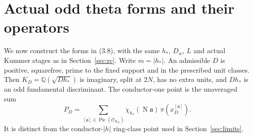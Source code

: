 \documentclass[11pt]{article}
\theoremstyle{definition}
\theoremstyle{remark}
\newcommand{\Q}{\mathbb Q}
\newcommand{\Norm}{\operatorname{N}}
\begin{document}


\section{Actual odd theta forms and their operators}\label{app:odd-source}
We now construct the forms in (3.8), with the same $h_*$, $D_w$, $L$
and actual Kummer stages as in Section~\ref{sec:rc}.
Write $m=|h_*|$. An admissible $D$ is positive, squarefree, prime to
the fixed support and in the prescribed unit classes. Then
$K_D=\Q(\sqrt{Dh_*})$ is imaginary, split at $2N$, has no extra
units, and $Dh_*$ is an odd fundamental discriminant.
The conductor-one point is the unaveraged sum
\[
 P_D=\sum_{[\mathfrak a]\in\operatorname{Pic}(\mathcal O_{K_D})}
       \chi_{h_*}(\Norm\mathfrak a)\,
                         \pi(x_D^{[\mathfrak a]}).               \tag{O.1}
\]
It is distinct from the conductor-$|h|$ ring-class point used in
Section~\ref{sec:limits}.

\end{document}
